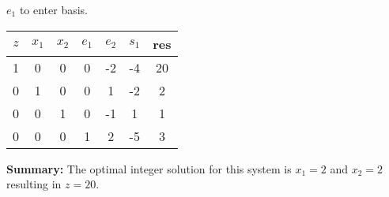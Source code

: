 \documentclass[answers]{exam}
\begin{document}
\begin{questions}
$e_1$ to enter basis.

\begin{tabular}{ccccccc}
	$z$ & $x_1$ & $x_2$ & $e_1$ & $e_2$ & $s_1$ & res \\ \hline
	1   & 0     & 0     & 0     & -2    & -4    & 20  \\
	0   & 1     & 0     & 0     & 1     & -2    & 2   \\
	0   & 0     & 1     & 0     & -1    & 1     & 1   \\
	0   & 0     & 0     & 1     & 2     & -5    & 3  
\end{tabular}

\textbf{Summary: } The optimal integer solution for this system is 
\(x_1=2\) and \(x_2=2\) resulting in \(z=20\).


\end{questions}
\end{document}
